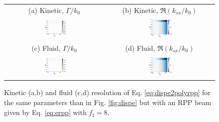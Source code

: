 \documentclass[
 reprint,
 amsmath,amssymb,
 aps,
]{revtex4-1}
\begin{document}
 \begin{figure}
\begin{tabular}{cc}
(a) Kinetic, $\Gamma/k_0$ &
(b)  Kinetic, $\Re(k_{sx}/k_0)$ \\
\includegraphics[width=0.24\textwidth]{gkH300eV.png}&
\includegraphics[width=0.24\textwidth]{kkH300eV.png}\\
(c) Fluid, $\Gamma/k_0$  &
(d) Fluid, $\Re(k_{sx}/k_0)$  \\
\includegraphics[width=0.24\textwidth]{gfH300eV.png}&
\includegraphics[width=0.24\textwidth]{kfH300eV.png}
\end{tabular}
\caption{ \label{fig:disperpp}  
Kinetic (a,b) and fluid (c,d) resolution of Eq. \eqref{eq:dispe2polyrpp} for  the same parameters than in Fig. \ref{fig:dispe} but with an RPP beam given by Eq. \eqref{eq:erpp} with $f_\sharp=8$. 
 }
\end{figure}
\end{document}
